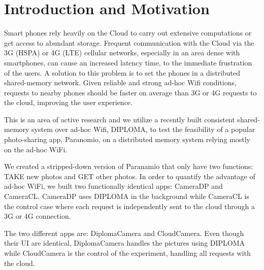 \chapter{Introduction and Motivation}

Smart phones rely heavily on the Cloud to carry out extensive computations or get access to abundant storage.  Frequent communication with the Cloud via the 3G (HSPA) or 4G (LTE) cellular networks, especially in an area dense with smartphones, can cause an increased latency time, to the immediate frustration of the users. A solution to this problem is to set the phones in a distributed shared-memory network. Given reliable and strong ad-hoc Wifi conditions, requests to nearby phones should be faster on average than 3G or 4G requests to the cloud, improving the user experience. 

This is an area of active research and we utilize a recently built consistent shared-memory system over ad-hoc Wifi, DIPLOMA, to test the feasibility of a popular photo-sharing app, Paranomio, on a distributed memory system relying mostly on the ad-hoc WiFi.

We created a stripped-down version of Paranamio that only have two functions: TAKE new photos and GET other photos. In order to quantify the advantage of ad-hoc WiFi, we built two functionally identical apps: CameraDP and CameraCL. CameraDP uses DIPLOMA in the background while CameraCL is the control case where each request is independently sent to the cloud through a 3G or 4G connection.

The two different apps are: DiplomaCamera and CloudCamera. Even though their UI are identical, DiplomaCamera handles the pictures using DIPLOMA while CloudCamera is the control of the experiment, handling all requests with the cloud.

